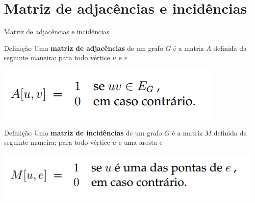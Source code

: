 \documentclass[xcolor=dvipsnames,table]{beamer}
\begin{document}
	\section{Matriz de adjacências e incidências}
	\begin{frame}{Matriz de adjacências e incidências}
		\begin{block}{Definição}
			Uma {\bf matriz de adjacências} de um grafo $G$ é a matriz $A$ definida da seguinte maneira: para todo vértice $u$ e $v$
			\begin{center}
				\includegraphics[width=.5\textwidth]{images/adjacencia.png}
			\end{center}
		\end{block} \pause
		\begin{block}{Definição}
			Uma {\bf matriz de incidências} de um grafo $G$ é a matriz $M$ definida da seguinte maneira: para todo vértice $u$ e uma aresta $e$
			\begin{center}
				\includegraphics[width=.6\textwidth]{images/incidencia.png}
			\end{center}
		\end{block}
	\end{frame}
	
	\begin{frame}
		\titlepage
	\end{frame}
	
\end{document}
